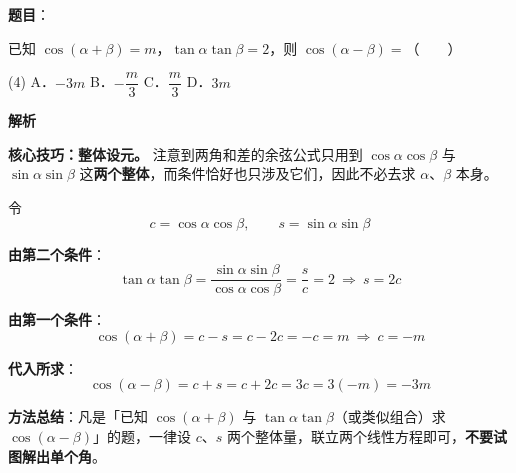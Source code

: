 \begin{answer}

\textbf{题目}：

已知 $\cos(\alpha+\beta)=m$，$\tan\alpha\tan\beta=2$，则 $\cos(\alpha-\beta)=$\mbox{（　　）}

\begin{gkopts}(4)
\task A．$-3m$
\task B．$-\dfrac m3$
\task C．$\dfrac m3$
\task D．$3m$
\end{gkopts}

\textbf{解析}

\textbf{核心技巧：整体设元。} 注意到两角和差的余弦公式只用到 $\cos\alpha\cos\beta$ 与 $\sin\alpha\sin\beta$ 这\textbf{两个整体}，而条件恰好也只涉及它们，因此不必去求 $\alpha$、$\beta$ 本身。

令
\nopagebreak[4]
\[c=\cos\alpha\cos\beta,\qquad s=\sin\alpha\sin\beta\]

\textbf{由第二个条件}：
\nopagebreak[4]
\[\tan\alpha\tan\beta=\frac{\sin\alpha\sin\beta}{\cos\alpha\cos\beta}=\frac sc=2\ \Longrightarrow\ s=2c\]

\textbf{由第一个条件}：
\nopagebreak[4]
\[\cos(\alpha+\beta)=c-s=c-2c=-c=m\ \Longrightarrow\ c=-m\]

\textbf{代入所求}：
\nopagebreak[4]
\[\cos(\alpha-\beta)=c+s=c+2c=3c=3(-m)=-3m\]

\begin{gktip}
\textbf{方法总结}：凡是「已知 $\cos(\alpha+\beta)$ 与 $\tan\alpha\tan\beta$（或类似组合）求 $\cos(\alpha-\beta)$」的题，一律设 $c$、$s$ 两个整体量，联立两个线性方程即可，\textbf{不要试图解出单个角}。
\end{gktip}


\par\medskip

\end{answer}
